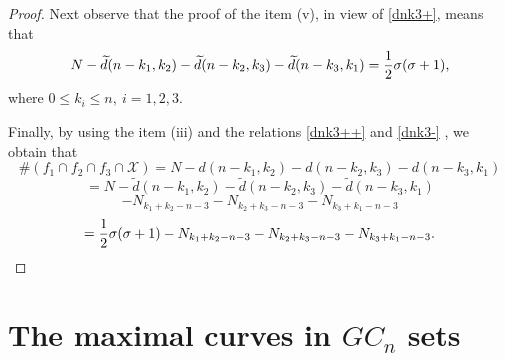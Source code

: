 \documentclass[a4paper,12pt]{article}
\theoremstyle{definition}
\numberwithin{equation}{section}
\numberwithin{figure}{section}
\newcommand{\Xset}{\mathcal{X}}
\begin{document}
\begin{proof}
Next observe that the proof of the item (v), in view of \eqref{dnk3+}, means that
\begin{equation}\label{dnk3-}N-\widetilde d(n-k_1, k_2)-\widetilde d(n-k_2,k_3)-\widetilde d(n-k_3,k_1)={1\over 2} \sigma(\sigma+1),\end{equation}
where $0\le k_i\le n,\ i=1,2,3.$

\noindent Finally, by using the item (iii) and the 
relations \eqref{dnk3++} and \eqref{dnk3-} , we obtain that 
$$\#(f_1\cap f_2\cap f_3 \cap \Xset)=N-d(n-k_1, k_2)- d(n-k_2,k_3)-d(n-k_3,k_1)$$ $$=N-\widetilde d(n-k_1, k_2)-\widetilde d(n-k_2,k_3)-\widetilde d(n-k_3,k_1)$$ 
$$-N_{k_1+k_2-n-3}-N_{k_2+k_3-n-3}-N_{k_3+k_1-n-3}$$
$$={1\over 2} \sigma(\sigma+1)-N_{k_1+k_2-n-3}-N_{k_2+k_3-n-3}-N_{k_3+k_1-n-3}.$$
\end{proof}





\section{The maximal curves in $GC_n$ sets}
\end{document}
